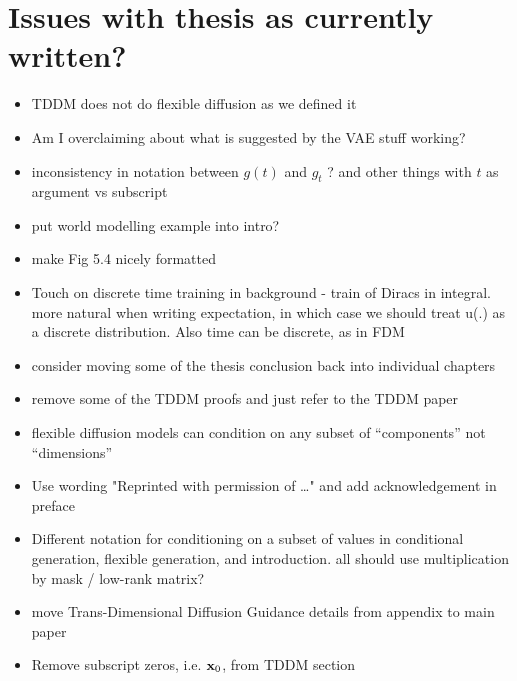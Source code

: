 \section*{Issues with thesis as currently written?}

\begin{itemize}
    \item TDDM does not do flexible diffusion as we defined it
    \item Am I overclaiming about what is suggested by the VAE stuff working?
    \item inconsistency in notation between $g(t)$ and $g_t$ ? and other things with $t$ as argument vs subscript
    \item put world modelling example into intro?
    \item make Fig 5.4 nicely formatted
    \item Touch on discrete time training in background - train of Diracs in integral. more natural when writing expectation, in which case we should treat u(.) as a discrete distribution. Also time can be discrete, as in FDM
    \item consider moving some of the thesis conclusion back into individual chapters
    \item remove some of the TDDM proofs and just refer to the TDDM paper
    \item flexible diffusion models can condition on any subset of ``components'' not ``dimensions''
    \item Use wording "Reprinted with permission of …" and add acknowledgement in preface
    \item Different notation for conditioning on a subset of values in conditional generation, flexible generation, and introduction. all should use  multiplication by mask / low-rank matrix?
    \item move Trans-Dimensional Diffusion Guidance details from appendix to main paper
    \item Remove subscript zeros, i.e. ${\mathbf{x}}_0$, from TDDM section
\end{itemize}

